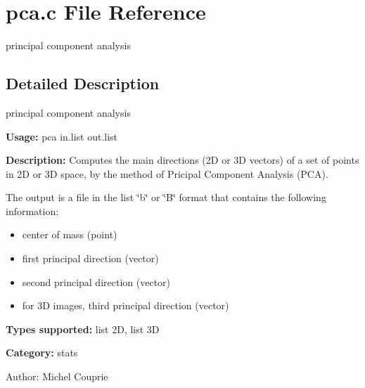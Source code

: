 \section{pca.c File Reference}
\label{pca_8c}
principal component analysis 



\subsection{Detailed Description}
principal component analysis 

{\bf Usage:} pca in.list out.list

{\bf Description:} Computes the main directions (2D or 3D vectors) of a set of points in 2D or 3D space, by the method of Pricipal Component Analysis (PCA).

The output is a file in the list \char`\"{}b\char`\"{} or \char`\"{}B\char`\"{} format that contains the following information: \begin{itemize}
\item center of mass (point) \item first principal direction (vector) \item second principal direction (vector) \item for 3D images, third principal direction (vector)\end{itemize}
{\bf Types supported:} list 2D, list 3D

{\bf Category:} stats

\begin{Desc}
\item[Author:]Michel Couprie \end{Desc}
